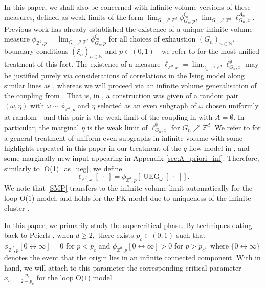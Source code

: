 \documentclass[article,11pt,reqno]{amsart}
\newcommand{\cc}{\leftrightarrow}
\begin{document}
In this paper, we shall also be concerned with infinite volume versions of these measures, defined as weak limits of the form $\lim_{G_n\nearrow \mathbb{Z}^d} \phi_{G_n,p}^{\xi_n}$, $\lim_{G_n\nearrow \mathbb{Z}^d} \ell_{G_n,x}^{A_n}$. Previous work has already established the existence of a unique infinite volume measure $\phi_{\mathbb{Z}^d,p}=\lim_{G_n\nearrow \mathbb{Z}^d} \phi_{G_n,p}^{\xi_n}$ for all choices of exhaustion $(G_n)_{n\in\mathbb{N}},$ boundary conditions $(\xi_n)_{n\in \mathbb{N}}$ and $p\in (0,1)$ - we refer to \cite{raoufi2020translation} for the most unified treatment of this fact. The existence of a measure $\ell_{\mathbb{Z}^d,x}=\lim_{G_n\nearrow \mathbb{Z}^d} \ell^{\emptyset}_{G_n,x}$ may be justified purely via considerations of correlations in the Ising model along similar lines as \cite{aizenman2015random}, whereas we will  proceed via an infinite volume generalisation of the coupling from . That is, in \cite{hansen2023uniform}, a construction was given of a random pair $(\omega,\eta)$ with $\omega\sim \phi_{\mathbb{Z}^d,p}$ and $\eta$ selected as an even subgraph of $\omega$ chosen uniformly at random - and this pair is the weak limit of the coupling in  with $A=\emptyset$. In particular, the marginal $\eta$ is the weak limit of $\ell^{\emptyset}_{G_n,x}$ for $G_n\nearrow \mathbb{Z}^d.$ We refer to \cite[Section 3]{hansen2023uniform} for a general treatment of uniform even subgraphs in infinite volume with some highlights repeated in this paper in our treatment of the $q$-flow model in , and some marginally new input appearing in Appendix \ref{sec:A_priori_inf}. Therefore, similarly to \eqref{O(1)_as_ueg}, we define
\begin{equation} \label{O(1)_as_inf_ueg}
\ell_{\mathbb{Z}^d,x}[\;\cdot\;]=\phi_{\mathbb{Z}^d,p}[\operatorname{UEG}_{\omega}[\;\cdot\;]].
\end{equation}
We note that \eqref{SMP} transfers to the infinite volume limit automatically for the loop O($1$) model, and holds for the FK model due to uniqueness of the infinite cluster \cite{BurtonKeane}.

In this paper, we primarily study the supercritical phase. By techniques dating back to Peierls \cite{peierls1936ising}, when $d\geq 2,$ there exists $p_c\in (0,1)$ such that $\phi_{\mathbb{Z}^d,p}[0\cc\infty]=0$ for $p<p_c$ and $\phi_{\mathbb{Z}^d,p}[0\cc\infty]>0$ for $p>p_c,$ where $\{0\cc \infty\}$ denotes the event that the origin lies in an infinite connected component. With  in hand, we will attach to this parameter the corresponding critical parameter $x_c=\frac{p_c}{2-p_c}$ for the loop O($1$) model.
\end{document}
